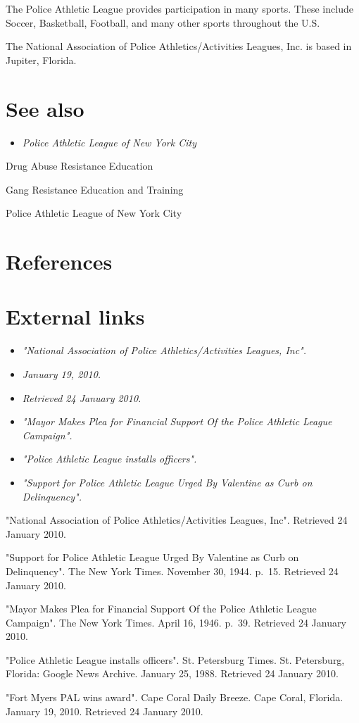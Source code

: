 The Police Athletic League provides participation in many sports. These
include Soccer, Basketball, Football, and many other sports throughout
the U.S.

The National Association of Police Athletics/Activities Leagues, Inc. is
based in Jupiter, Florida.

\section{See also}\label{see-also}

\begin{itemize}
\item
  \emph{Police Athletic League of New York City}
\end{itemize}

Drug Abuse Resistance Education

Gang Resistance Education and Training

Police Athletic League of New York City

\section{References}\label{references}

\section{External links}\label{external-links}

\begin{itemize}
\item
  \emph{"National Association of Police Athletics/Activities Leagues,
  Inc".}
\item
  \emph{January 19, 2010.}
\item
  \emph{Retrieved 24 January 2010.}
\item
  \emph{"Mayor Makes Plea for Financial Support Of the Police Athletic
  League Campaign".}
\item
  \emph{"Police Athletic League installs officers".}
\item
  \emph{"Support for Police Athletic League Urged By Valentine as Curb
  on Delinquency".}
\end{itemize}

"National Association of Police Athletics/Activities Leagues, Inc".
Retrieved 24 January 2010.

"Support for Police Athletic League Urged By Valentine as Curb on
Delinquency". The New York Times. November 30, 1944. p.~15. Retrieved 24
January 2010.

"Mayor Makes Plea for Financial Support Of the Police Athletic League
Campaign". The New York Times. April 16, 1946. p.~39. Retrieved 24
January 2010.

"Police Athletic League installs officers". St. Petersburg Times. St.
Petersburg, Florida: Google News Archive. January 25, 1988. Retrieved 24
January 2010.

"Fort Myers PAL wins award". Cape Coral Daily Breeze. Cape Coral,
Florida. January 19, 2010. Retrieved 24 January 2010.
